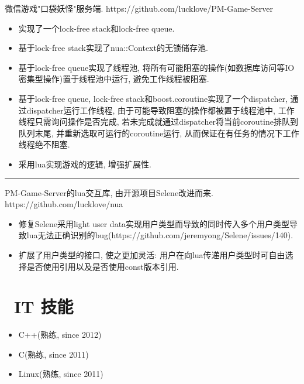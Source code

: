 \documentclass{resume}
\newcommand{\subsectionrule}{{\vspace{-8pt}\hspace{0.5cm}\rule[1pt]{\linewidth-1cm}{0.05pt}\vspace{-8pt}}}
\begin{document}
\begin{onehalfspacing}
微信游戏"口袋妖怪"服务端.
\newline
https://github.com/lucklove/PM-Game-Server
\begin{itemize}
  \item 实现了一个lock-free stack和lock-free queue.
  \item 基于lock-free stack实现了nua::Context的无锁储存池.
  \item 基于lock-free queue实现了线程池, 将所有可能阻塞的操作(如数据库访问等IO密集型操作)置于线程池中运行, 避免工作线程被阻塞.
  \item 基于lock-free queue, lock-free stack和boost.coroutine实现了一个dispatcher, 通过dispatcher运行工作线程, 由于可能导致阻塞的操作都被置于线程池中, 工作线程只需询问操作是否完成, 若未完成就通过dispatcher将当前coroutine排队到队列末尾, 并重新选取可运行的coroutine运行, 从而保证在有任务的情况下工作线程绝不阻塞.
  \item 采用lua实现游戏的逻辑, 增强扩展性.
\end{itemize}
\end{onehalfspacing}

\subsectionrule

\begin{onehalfspacing}
PM-Game-Server的lua交互库, 由开源项目Selene改进而来.
\newline
https://github.com/lucklove/nua
\begin{itemize}
  \item 修复Selene采用light user data实现用户类型而导致的同时传入多个用户类型导致lua无法正确识别的bug(https://github.com/jeremyong/Selene/issues/140).
  \item 扩展了用户类型的接口, 使之更加灵活: 用户在向lua传递用户类型时可自由选择是否使用引用以及是否使用const版本引用.
\end{itemize}
\end{onehalfspacing}



\section{\faCogs\ IT 技能}
\begin{itemize}[parsep=0.5ex]
  \item C++(熟练, since 2012)
  \item C(熟练, since 2011)
  \item Linux(熟练, since 2011)
\end{itemize}
\end{document}

